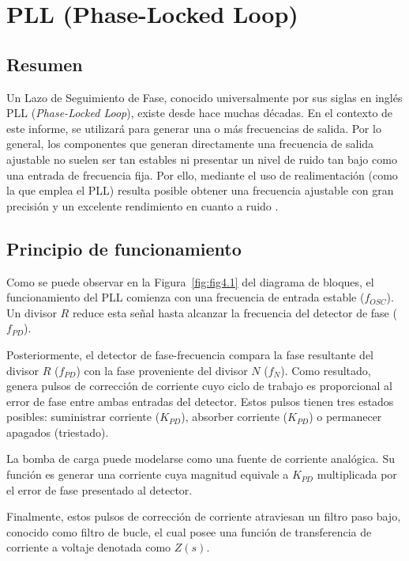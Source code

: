 \chapter{PLL (Phase-Locked Loop)}

\section*{Resumen}

Un Lazo de Seguimiento de Fase, conocido universalmente por sus siglas en inglés PLL (\textit{Phase-Locked Loop}), existe desde hace muchas décadas. En el contexto de este informe, se utilizará para generar una o más frecuencias de salida. Por lo general, los componentes que generan directamente una frecuencia de salida ajustable no suelen ser tan estables ni presentar un nivel de ruido tan bajo como una entrada de frecuencia fija. Por ello, mediante el uso de realimentación (como la que emplea el PLL) resulta posible obtener una frecuencia ajustable con gran precisión y un excelente rendimiento en cuanto a ruido \cite{Dean Banerjee}.

\section{Principio de funcionamiento}

Como se puede observar en la Figura~\ref{fig:fig4.1} del diagrama de bloques, el funcionamiento del PLL comienza con una frecuencia de entrada estable ($f_{OSC}$). Un divisor $R$ reduce esta señal hasta alcanzar la frecuencia del detector de fase ($f_{PD}$).

Posteriormente, el detector de fase-frecuencia compara la fase resultante del divisor $R$ ($f_{PD}$) con la fase proveniente del divisor $N$ ($f_N$). Como resultado, genera pulsos de corrección de corriente cuyo ciclo de trabajo es proporcional al error de fase entre ambas entradas del detector. Estos pulsos tienen tres estados posibles: suministrar corriente ($K_{PD}$), absorber corriente ($K_{PD}$) o permanecer apagados (triestado).

La bomba de carga puede modelarse como una fuente de corriente analógica. Su función es generar una corriente cuya magnitud equivale a $K_{PD}$ multiplicada por el error de fase presentado al detector.

Finalmente, estos pulsos de corrección de corriente atraviesan un filtro paso bajo, conocido como filtro de bucle, el cual posee una función de transferencia de corriente a voltaje denotada como $Z(s)$.

